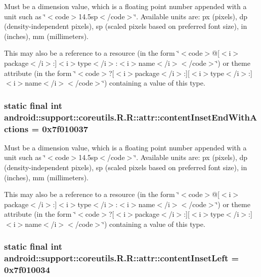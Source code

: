 Must be a dimension value, which is a floating point number appended with a unit such as \char`\"{}$<$code$>$14.5sp$<$/code$>$\char`\"{}. Available units are: px (pixels), dp (density-independent pixels), sp (scaled pixels based on preferred font size), in (inches), mm (millimeters). 

This may also be a reference to a resource (in the form \char`\"{}$<$code$>$@\mbox{[}$<$i$>$package$<$/i$>$:\mbox{]}$<$i$>$type$<$/i$>$:$<$i$>$name$<$/i$>$$<$/code$>$\char`\"{}) or theme attribute (in the form \char`\"{}$<$code$>$?\mbox{[}$<$i$>$package$<$/i$>$:\mbox{]}\mbox{[}$<$i$>$type$<$/i$>$:\mbox{]}$<$i$>$name$<$/i$>$$<$/code$>$\char`\"{}) containing a value of this type. \hypertarget{classandroid_1_1support_1_1coreutils_1_1_r_1_1attr_8f42fafd955f39238cc61fc3fc9e3f83}{
\subsubsection[{contentInsetEndWithActions}]{\setlength{\rightskip}{0pt plus 5cm}static final int android::support::coreutils.R.R::attr::contentInsetEndWithActions = 0x7f010037}}
\label{classandroid_1_1support_1_1coreutils_1_1_r_1_1attr_8f42fafd955f39238cc61fc3fc9e3f83}


Must be a dimension value, which is a floating point number appended with a unit such as \char`\"{}$<$code$>$14.5sp$<$/code$>$\char`\"{}. Available units are: px (pixels), dp (density-independent pixels), sp (scaled pixels based on preferred font size), in (inches), mm (millimeters). 

This may also be a reference to a resource (in the form \char`\"{}$<$code$>$@\mbox{[}$<$i$>$package$<$/i$>$:\mbox{]}$<$i$>$type$<$/i$>$:$<$i$>$name$<$/i$>$$<$/code$>$\char`\"{}) or theme attribute (in the form \char`\"{}$<$code$>$?\mbox{[}$<$i$>$package$<$/i$>$:\mbox{]}\mbox{[}$<$i$>$type$<$/i$>$:\mbox{]}$<$i$>$name$<$/i$>$$<$/code$>$\char`\"{}) containing a value of this type. \hypertarget{classandroid_1_1support_1_1coreutils_1_1_r_1_1attr_ecdc0128c8b714fbfecea15a8b99d3b3}{
\subsubsection[{contentInsetLeft}]{\setlength{\rightskip}{0pt plus 5cm}static final int android::support::coreutils.R.R::attr::contentInsetLeft = 0x7f010034}}
\label{classandroid_1_1support_1_1coreutils_1_1_r_1_1attr_ecdc0128c8b714fbfecea15a8b99d3b3}


